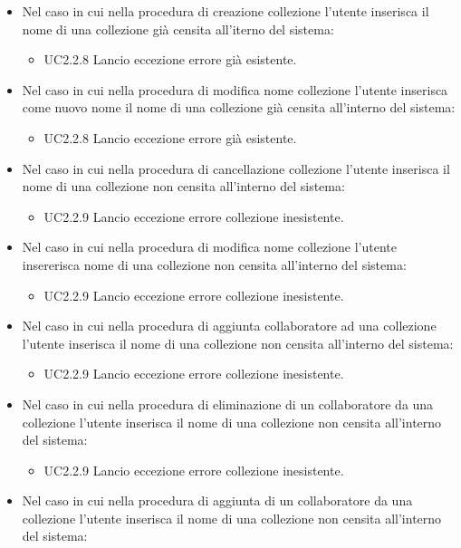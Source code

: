 \documentclass{scalatekids-article}
\begin{document}
\begin{itemize}
  \item Nel caso in cui nella procedura di creazione collezione l'utente inserisca il nome di una collezione già censita all'iterno del sistema:
  \begin{itemize}
    \item UC2.2.8 Lancio eccezione errore  già esistente.
  \end{itemize}
  \item Nel caso in cui nella procedura di modifica nome collezione l'utente inserisca come nuovo nome il nome di una collezione già censita all'interno del sistema:
  \begin{itemize}
    \item UC2.2.8 Lancio eccezione errore  già esistente.
  \end{itemize}
  \item Nel caso in cui nella procedura di cancellazione collezione l'utente inserisca il nome di una collezione non censita all'interno del sistema:
  \begin{itemize}
    \item UC2.2.9 Lancio eccezione errore collezione inesistente.
  \end{itemize}
  \item Nel caso in cui nella procedura di modifica nome collezione l'utente insererisca nome di una collezione non censita all'interno del sistema:
  \begin{itemize}
    \item UC2.2.9 Lancio eccezione errore collezione inesistente.
  \end{itemize}
  \item Nel caso in cui nella procedura di aggiunta collaboratore ad una  collezione l'utente inserisca il nome di una collezione non censita all'interno del sistema:
  \begin{itemize}
    \item UC2.2.9 Lancio eccezione errore collezione inesistente.
  \end{itemize}
  \item Nel caso in cui nella procedura di eliminazione di un collaboratore da una collezione l'utente inserisca il nome di una collezione non censita all'interno del sistema:
  \begin{itemize}
    \item UC2.2.9 Lancio eccezione errore collezione inesistente.
  \end{itemize}
  \item Nel caso in cui nella procedura di aggiunta di un collaboratore da una collezione l'utente inserisca il nome di una collezione non censita all'interno del sistema:

\end{itemize}
\end{document}
